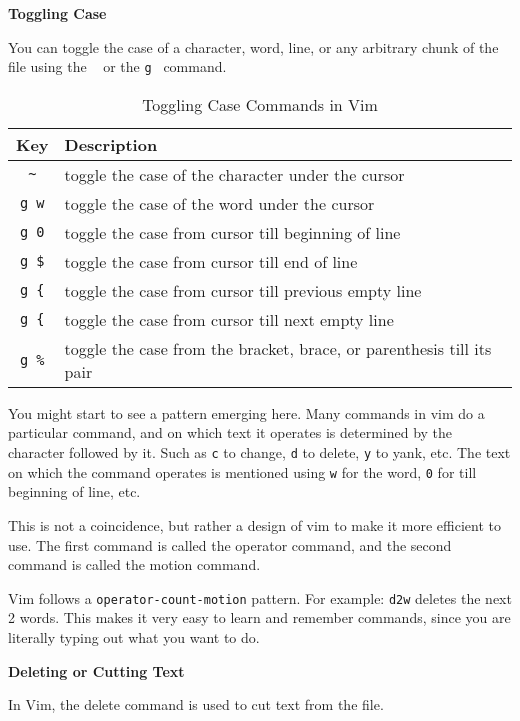 \textbf{Toggling Case}

You can toggle the case of a character, word, line,
or any arbitrary chunk of the file using the \texttt{~}
or the \texttt{g~} command.

\begin{table}[h!]
  \caption{Toggling Case Commands in Vim}
  \begin{tabular}{c l}
    \toprule
    Key & Description \\
    \midrule
    \texttt{\textasciitilde} & toggle the case of the character under the cursor \\
    \texttt{g~w} & toggle the case of the word under the cursor \\
    \texttt{g~0} & toggle the case from cursor till beginning of line \\
    \texttt{g~\$} & toggle the case from cursor till end of line \\
    \texttt{g~\{} & toggle the case from cursor till previous empty line \\
    \texttt{g~\{} & toggle the case from cursor till next empty line \\
    \texttt{g~\%} & toggle the case from the bracket, brace, or parenthesis till its pair \\
    \bottomrule
  \end{tabular}
\end{table}

You might start to see a pattern emerging here.
Many commands in vim do a particular command,
and on which text it operates is determined by
the character followed by it. Such as \texttt{c}
to change, \texttt{d} to delete, \texttt{y} to yank,
etc. The text on which the command operates is
mentioned using \texttt{w} for the word, \texttt{0}
for till beginning of line, etc.

This is not a coincidence, but rather a design
of vim to make it more efficient to use.
The first command is called the operator command,
and the second command is called the motion command.

Vim follows a \texttt{operator-count-motion} pattern.
For example: \texttt{d2w} deletes the next 2 words.
This makes it very easy to learn and remember commands,
since you are literally typing out what you want to do.

\textbf{Deleting or Cutting Text}

In Vim, the delete command is used to cut text from the file.

